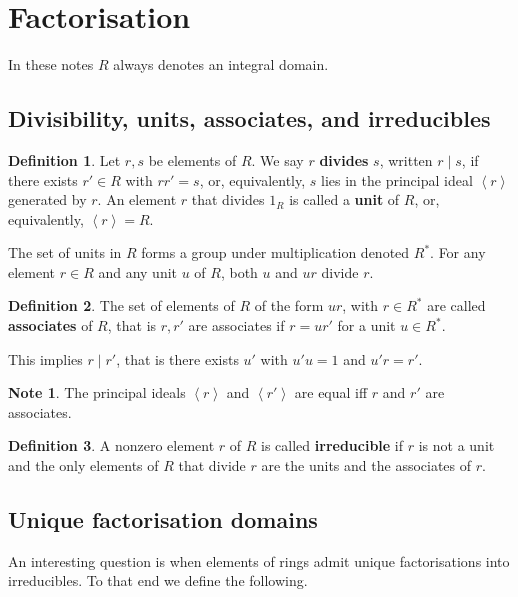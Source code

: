 \documentclass{article}
\newcommand{\ab}[1]{\left\langle #1 \right\rangle}
\theoremstyle{definition}\newtheorem{definition}{Definition}[subsection]
\theoremstyle{definition}\newtheorem{remark}[definition]{Remark}
\theoremstyle{definition}\newtheorem*{example}{Example}
\theoremstyle{definition}\newtheorem*{note}{Note}
\begin{document}
\section{Factorisation}

In these notes $ R $ always denotes an integral domain.

\subsection{Divisibility, units, associates, and irreducibles}

\begin{definition}
Let $ r, s $ be elements of $ R $. We say $ r $ \textbf{divides} $ s $, written $ r \mid s $, if there exists $ r' \in R $ with $ rr' = s $, or, equivalently, $ s $ lies in the principal ideal $ \ab{r} $ generated by $ r $. An element $ r $ that divides $ 1_R $ is called a \textbf{unit} of $ R $, or, equivalently, $ \ab{r} = R $.
\end{definition}

The set of units in $ R $ forms a group under multiplication denoted $ R^* $. For any element $ r \in R $ and any unit $ u $ of $ R $, both $ u $ and $ ur $ divide $ r $.

\begin{definition}
The set of elements of $ R $ of the form $ ur $, with $ r \in R^* $ are called \textbf{associates} of $ R $, that is $ r, r' $ are associates if $ r = ur' $ for a unit $ u \in R^* $.
\end{definition}

This implies $ r \mid r' $, that is there exists $ u' $ with $ u'u = 1 $ and $ u'r = r' $.

\begin{note}
The principal ideals $ \ab{r} $ and $ \ab{r'} $ are equal iff $ r $ and $ r' $ are associates.
\end{note}

\begin{definition}
A nonzero element $ r $ of $ R $ is called \textbf{irreducible} if $ r $ is not a unit and the only elements of $ R $ that divide $ r $ are the units and the associates of $ r $.
\end{definition}

\subsection{Unique factorisation domains}

An interesting question is when elements of rings admit unique factorisations into irreducibles. To that end we define the following.
\end{document}
